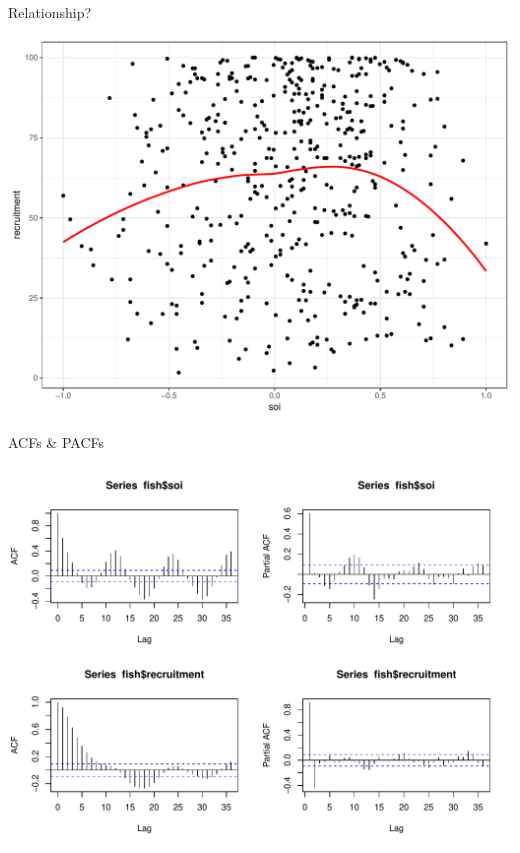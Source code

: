 \documentclass[11pt,ignorenonframetext,]{beamer}
\begin{document}
\begin{frame}{Relationship?}

\includegraphics{Lec7_files/figure-beamer/unnamed-chunk-3-1.pdf}

\end{frame}

\begin{frame}{ACFs \& PACFs}

\includegraphics{Lec7_files/figure-beamer/unnamed-chunk-4-1.pdf}

\end{frame}
\end{document}
